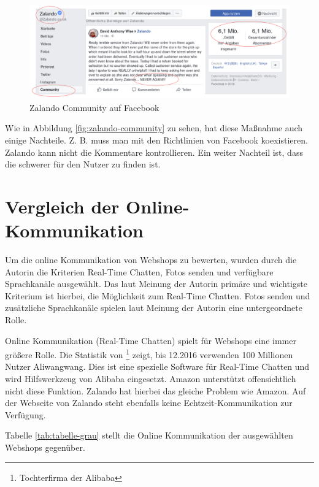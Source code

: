 \begin{figure}[htbp]
	\centering
	\includegraphics[width=1\textwidth]{bilder/zalando-community.png}
	\caption{Zalando Community auf Facebook}
	\label{fig:zalando-community}
\end{figure}

Wie in Abbildung \vref{fig:zalando-community} zu sehen, hat diese Maßnahme auch einige Nachteile. Z. B. muss man mit den Richtlinien von Facebook koexistieren. Zalando kann nicht die Kommentare kontrollieren. Ein weiter Nachteil ist, dass die schwerer für den Nutzer zu finden ist.


\section{Vergleich der Online-Kommunikation}

Um die online Kommunikation von Webshops zu bewerten, wurden durch die Autorin die Kriterien Real-Time Chatten, Fotos senden und verfügbare Sprachkanäle ausgewählt. Das laut Meinung der Autorin primäre und wichtigste Kriterium ist hierbei, die Möglichkeit zum Real-Time Chatten. Fotos senden und zusätzliche Sprachkanäle spielen laut Meinung der Autorin eine untergeordnete Rolle.

Online Kommunikation (Real-Time Chatten) spielt für Webshops eine immer größere Rolle. Die Statistik von \textcite{aliyun}\footnote{Tochterfirma der Alibaba} zeigt, bis 12.2016 verwenden 100 Millionen Nutzer Aliwangwang. Dies ist eine spezielle Software für Real-Time Chatten und wird Hilfswerkzeug von Alibaba eingesetzt. Amazon unterstützt offensichtlich nicht diese Funktion. Zalando hat hierbei das gleiche Problem wie Amazon. Auf der Webseite von Zalando steht ebenfalls keine Echtzeit-Kommunikation zur Verfügung. \parencite{piatscheck}

Tabelle \vref{tab:tabelle-grau} stellt die Online Kommunikation der ausgewählten Webshops gegenüber.

